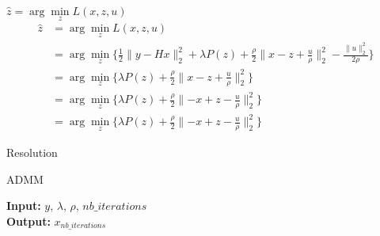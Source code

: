 \begin{frame}{$\hat z = \arg\min\limits_{z} {L(x, z, u)}$}
    \begin{align*}
        \hat z
        &= \arg\min\limits_{z} L(x, z, u) \\
        &= \arg\min\limits_{z} \{
            \frac{1}{2} \lVert y - Hx \rVert_{2}^{2} + \lambda P(z) +
            \frac{\rho}{2} \lVert x-z+\frac{u}{\rho} \rVert_{2}^{2} 
            - \frac{\lVert u \rVert_{2}^{2}}{2\rho}
        \} \\
        &= \arg\min\limits_{z} \{
            \lambda P(z) +
            \frac{\rho}{2} \lVert x-z+\frac{u}{\rho} \rVert_{2}^{2} 
        \} \\
        &= \arg\min\limits_{z} \{
            \lambda P(z) +
            \frac{\rho}{2} \lVert -x+z-\frac{u}{\rho} \rVert_{2}^{2} 
        \} \\
        &= \arg\min\limits_{z} \{
            \lambda P(z) +
            \frac{\rho}{2} \lVert -x+z-\frac{u}{\rho} \rVert_{2}^{2} 
        \}
    \end{align*}
\end{frame}

\begin{frame}{Resolution}

    \begin{algorithm}[H]
        \caption{ADMM} %
        \begin{algorithmic}[1]
            \newline
            \textbf{Input:} $y$, $\lambda$, $\rho$, $nb\_iterations$ \\
            \textbf{Output:} $x_{nb\_iterations}$
            \EndFor
            \EndProcedure
        \end{algorithmic}
    \end{algorithm}
    \end{frame}

